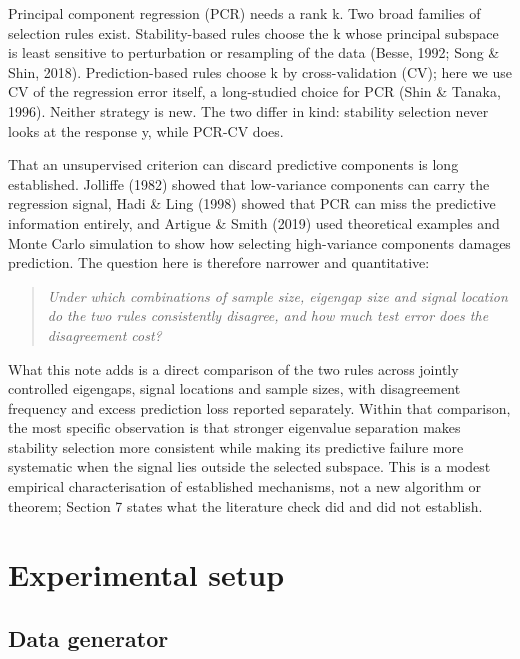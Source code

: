 \documentclass[11pt]{article}
\begin{document}
Principal component regression (PCR) needs a rank k. Two broad families of selection rules exist. Stability-based rules choose the k whose principal subspace is least sensitive to perturbation or resampling of the data (Besse, 1992; Song \& Shin, 2018). Prediction-based rules choose k by cross-validation (CV); here we use CV of the regression error itself, a long-studied choice for PCR (Shin \& Tanaka, 1996). Neither strategy is new. The two differ in kind: stability selection never looks at the response y, while PCR-CV does.\par

That an unsupervised criterion can discard predictive components is long established. Jolliffe (1982) showed that low-variance components can carry the regression signal, Hadi \& Ling (1998) showed that PCR can miss the predictive information entirely, and Artigue \& Smith (2019) used theoretical examples and Monte Carlo simulation to show how selecting high-variance components damages prediction. The question here is therefore narrower and quantitative:\par

\begin{quote}\itshape\centering Under which combinations of sample size, eigengap size and signal location do the two rules consistently disagree, and how much test error does the disagreement cost?\end{quote}

What this note adds is a direct comparison of the two rules across jointly controlled eigengaps, signal locations and sample sizes, with disagreement frequency and excess prediction loss reported separately. Within that comparison, the most specific observation is that stronger eigenvalue separation makes stability selection more consistent while making its predictive failure more systematic when the signal lies outside the selected subspace. This is a modest empirical characterisation of established mechanisms, not a new algorithm or theorem; Section 7 states what the literature check did and did not establish.\par

\section{Experimental setup}

\subsection{Data generator}
\end{document}
